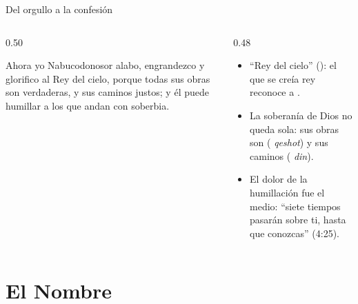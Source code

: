 \begin{frame}{Del orgullo a la confesión}
\begin{columns}[t,onlytextwidth]
\begin{column}{0.50\textwidth}
\begin{cita}Ahora yo Nabucodonosor alabo, engrandezco y glorifico al Rey del cielo, porque todas sus obras son verdaderas, y sus caminos justos; y él puede humillar a los que andan con soberbia.\end{cita}
\begin{center}\\ \end{center}
\end{column}
\begin{column}{0.48\textwidth}\small
\begin{itemize}
\item ``Rey del cielo'' (): el que se creía rey reconoce a .
\item La soberanía de Dios no queda sola: sus obras son  ( \emph{qeshot}) y sus caminos  ( \emph{din}).
\item El dolor de la humillación fue el medio: ``siete tiempos pasarán sobre ti, hasta que conozcas'' (4:25).
\end{itemize}
\end{column}
\end{columns}\par\smallskip
{}
\end{frame}

\section{El Nombre}

